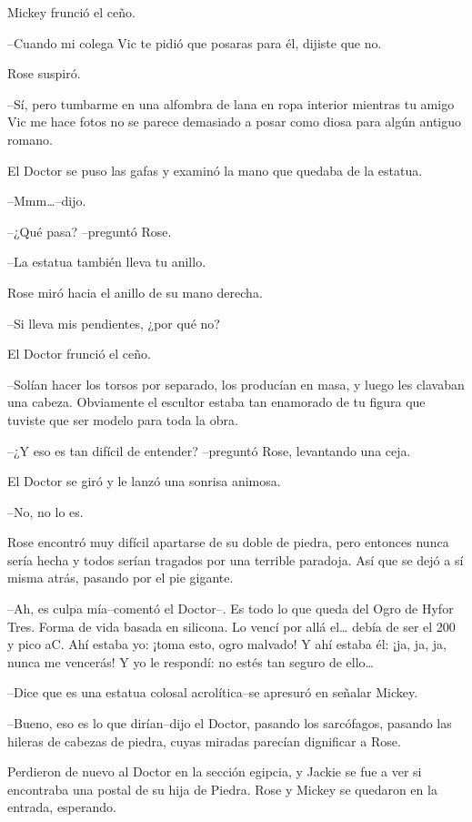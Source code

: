 Mickey frunció el ceño.

--Cuando mi colega Vic te pidió que posaras para él, dijiste que no.

Rose suspiró.

--Sí, pero tumbarme en una alfombra de lana en ropa interior mientras tu
amigo Vic me hace fotos no se parece demasiado a posar como diosa para
algún antiguo romano.

El Doctor se puso las gafas y examinó la mano que quedaba de la estatua.

--Mmm\ldots{}--dijo.

--¿Qué pasa? --preguntó Rose.

--La estatua también lleva tu anillo.

Rose miró hacia el anillo de su mano derecha.

--Si lleva mis pendientes, ¿por qué no?

El Doctor frunció el ceño.

--Solían hacer los torsos por separado, los producían en masa, y luego
les clavaban una cabeza. Obviamente el escultor estaba tan enamorado de
tu figura que tuviste que ser modelo para toda la obra.

--¿Y eso es tan difícil de entender? --preguntó Rose, levantando una
ceja.

El Doctor se giró y le lanzó una sonrisa animosa.

--No, no lo es.

Rose encontró muy difícil apartarse de su doble de piedra, pero entonces
nunca sería hecha y todos serían tragados por una terrible paradoja. Así
que se dejó a sí misma atrás, pasando por el pie gigante.

--Ah, es culpa mía--comentó el Doctor--. Es todo lo que queda del Ogro
de Hyfor Tres. Forma de vida basada en silicona. Lo vencí por allá
el\ldots{} debía de ser el 200 y pico aC. Ahí estaba yo: ¡toma esto,
ogro malvado! Y ahí estaba él: ¡ja, ja, ja, nunca me vencerás! Y yo le
respondí: no estés tan seguro de ello\ldots{}

--Dice que es una estatua colosal acrolítica--se apresuró en señalar
Mickey.

--Bueno, eso es lo que dirían--dijo el Doctor, pasando los sarcófagos,
pasando las hileras de cabezas de piedra, cuyas miradas parecían
dignificar a Rose.

Perdieron de nuevo al Doctor en la sección egipcia, y Jackie se fue a
ver si encontraba una postal de su hija de Piedra. Rose y Mickey se
quedaron en la entrada, esperando.

